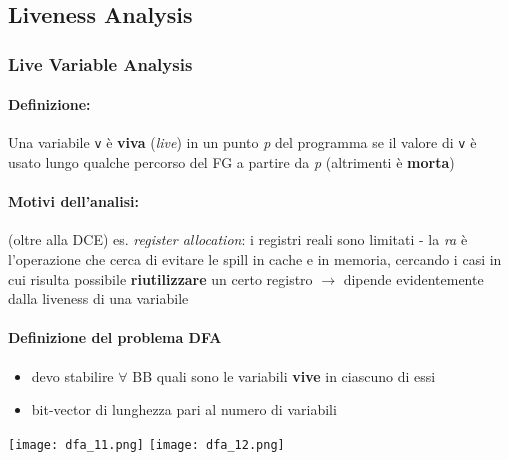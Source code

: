\subsection{Liveness Analysis}

\subsubsection{Live Variable Analysis}

\noindent\begin{minipage}[c]{.7\textwidth}
  \paragraph{Definizione:}

  Una variabile \lstinline|v| \`e \textbf{viva} (\textit{live}) in un punto \textit{p} del programma se il valore di \lstinline|v| \`e usato lungo qualche percorso del FG a partire da \textit{p} (altrimenti \`e \textbf{morta})\\

  \paragraph{Motivi dell'analisi:}

  (oltre alla DCE) es. \textit{register allocation}: i registri reali sono limitati - la \textit{ra} \`e l'operazione che cerca di evitare le spill in cache e in memoria, cercando i casi in cui risulta possibile \textbf{riutilizzare} un certo registro $\rightarrow$ dipende evidentemente dalla liveness di una variabile\\

  \paragraph{Definizione del problema DFA}

  \begin{itemize}
    \item devo stabilire $\forall$ BB quali sono le variabili \textbf{vive} in ciascuno di essi
    \item bit-vector di lunghezza pari al numero di variabili
  \end{itemize}
\end{minipage}
\begin{minipage}[c]{.3\textwidth}
  \texttt{[image: dfa\_11.png]}
  \texttt{[image: dfa\_12.png]}
\end{minipage}

